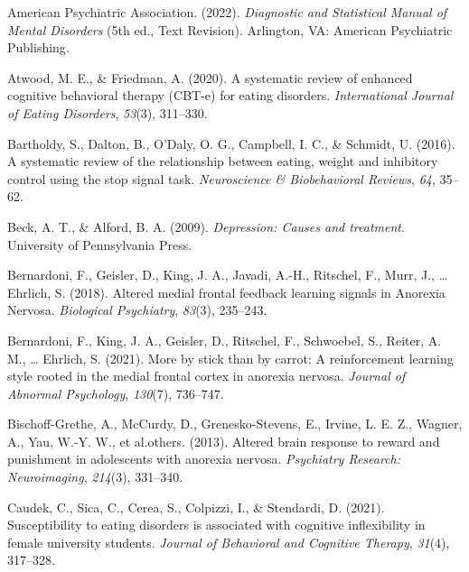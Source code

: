 \documentclass[
  man,floatsintext]{apa6}
\newlength{\cslhangindent}
\newlength{\cslentryspacingunit} %
\newenvironment{CSLReferences}[2] %
 {%
  \setlength{\parindent}{0pt}
  \ifodd #1
  \let\oldpar\par
  \def\par{\hangindent=\cslhangindent\oldpar}
  \fi
  \setlength{\parskip}{#2\cslentryspacingunit}
 }%
 {}
\begin{document}
\hypertarget{refs}{}
\begin{CSLReferences}{1}{0}
\leavevmode{}%
American Psychiatric Association. (2022). \emph{{Diagnostic and Statistical Manual of Mental Disorders}} (5th ed., Text Revision). Arlington, VA: {American Psychiatric Publishing}.

\leavevmode{}%
Atwood, M. E., \& Friedman, A. (2020). A systematic review of enhanced cognitive behavioral therapy (CBT-e) for eating disorders. \emph{International Journal of Eating Disorders}, \emph{53}(3), 311--330.

\leavevmode{}%
Bartholdy, S., Dalton, B., O'Daly, O. G., Campbell, I. C., \& Schmidt, U. (2016). A systematic review of the relationship between eating, weight and inhibitory control using the stop signal task. \emph{Neuroscience \& Biobehavioral Reviews}, \emph{64}, 35--62.

\leavevmode{}%
Beck, A. T., \& Alford, B. A. (2009). \emph{Depression: Causes and treatment}. University of Pennsylvania Press.

\leavevmode{}%
Bernardoni, F., Geisler, D., King, J. A., Javadi, A.-H., Ritschel, F., Murr, J., \ldots{} Ehrlich, S. (2018). Altered medial frontal feedback learning signals in {Anorexia} {Nervosa}. \emph{Biological Psychiatry}, \emph{83}(3), 235--243.

\leavevmode{}%
Bernardoni, F., King, J. A., Geisler, D., Ritschel, F., Schwoebel, S., Reiter, A. M., \ldots{} Ehrlich, S. (2021). More by stick than by carrot: A reinforcement learning style rooted in the medial frontal cortex in anorexia nervosa. \emph{Journal of Abnormal Psychology}, \emph{130}(7), 736--747.

\leavevmode{}%
Bischoff-Grethe, A., McCurdy, D., Grenesko-Stevens, E., Irvine, L. E. Z., Wagner, A., Yau, W.-Y. W., et al.others. (2013). Altered brain response to reward and punishment in adolescents with anorexia nervosa. \emph{Psychiatry Research: Neuroimaging}, \emph{214}(3), 331--340.

\leavevmode{}%
Caudek, C., Sica, C., Cerea, S., Colpizzi, I., \& Stendardi, D. (2021). Susceptibility to eating disorders is associated with cognitive inflexibility in female university students. \emph{Journal of Behavioral and Cognitive Therapy}, \emph{31}(4), 317--328.


\end{CSLReferences}
\end{document}
